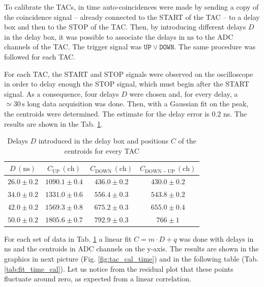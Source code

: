 \documentclass[a4paper]{article}
\begin{document}
To calibrate the TACs, in time auto-coincidences were made by sending a copy of the coincidence signal -- already connected to the START of the TAC -- to a delay box and then to the STOP of the TAC. Then, by introducing different delays $D$ in the delay box, it was possible to associate the delays in $\mathrm{ns}$ to the ADC channels of the TAC. The trigger signal was $\mathtt{UP\vee DOWN}$. %
The same procedure was followed for each TAC. 

For each TAC, the START and STOP signals were observed on the oscilloscope in order to delay enough the STOP signal, which must begin after the START signal. As a consequence, four delays $D$ were chosen and, for every delay, a $\simeq30\,\mathrm{s}$ long data acquisition was done. Then, with a Gaussian fit on the peak, the centroids were determined. The estimate for the delay error is 0.2 ns. %
The results are shown in the Tab. \ref{tab:tac_cal}.

\begin{table}[H]
    \centering
    \begin{tabular}{|c|ccc|}
    \hline
    $D\,\mathrm{(ns)}$ & $C_{\mathrm{UP}}\,\mathrm{(ch)}$& $C_{\mathrm{DOWN}}\,\mathrm{(ch)}$ & $C_{\mathrm{DOWN-UP}}\,\mathrm{(ch)}$ \\
    \hline
         $26.0\pm0.2$ & $1090.1\pm0.4$& $436.0\pm0.2$& $430.0\pm0.2$\\
         $34.0\pm0.2$ & $1331.0\pm0.6$& $556.4\pm0.3$& $543.8\pm0.2$\\
         $42.0\pm0.2$ & $1569.3\pm0.8$& $675.2\pm0.3$& $655.0\pm0.4$\\
         $50.0\pm0.2$ & $1805.6\pm0.7$& $792.9\pm0.3$& $766\pm1$ \\
    \hline
    \end{tabular}
    \caption{Delays $D$ introduced in the delay box and positions $C$ of the centroids for every TAC}
    \label{tab:tac_cal}
\end{table}

For each set of data in Tab. \ref{tab:tac_cal} a linear fit $C = m\cdot D + q$ was done with delays in $\mathrm{ns}$ and the centroids in ADC channels on the y-axis. The results are shown in the graphics in next picture (Fig. \ref{fig:tac_cal_time}) and in the following table (Tab. \ref{tab:fit_time_cal}). Let us notice from the residual plot that these points fluctuate around zero, as expected from a linear correlation. %
\end{document}
